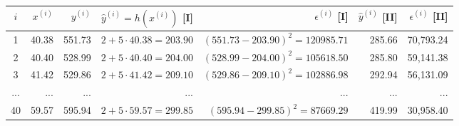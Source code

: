 \begin{tabular}{crrrrrr}
\toprule
 $i$ & $x^{(i)}$ & $y^{(i)}$ & $\hat y^{(i)} = h(x^{(i)})$ [I] &               $\epsilon^{(i)}$ [I] & $\hat y^{(i)}$ [II] & $\epsilon^{(i)}$ [II] \\
\midrule
   1 &     40.38 &    551.73 &   $2 + 5 \cdot 40.38 =  203.90$ &  $(551.73 - 203.90)^2 = 120985.71$ &              285.66 &             70,793.24 \\
   2 &     40.40 &    528.99 &   $2 + 5 \cdot 40.40 =  204.00$ &  $(528.99 - 204.00)^2 = 105618.50$ &              285.80 &             59,141.38 \\
   3 &     41.42 &    529.86 &   $2 + 5 \cdot 41.42 =  209.10$ &  $(529.86 - 209.10)^2 = 102886.98$ &              292.94 &             56,131.09 \\
 ... &       ... &       ... &                             ... &                                ... &                 ... &                   ... \\
  40 &     59.57 &    595.94 &   $2 + 5 \cdot 59.57 =  299.85$ &   $(595.94 - 299.85)^2 = 87669.29$ &              419.99 &             30,958.40 \\
\bottomrule
\end{tabular}
